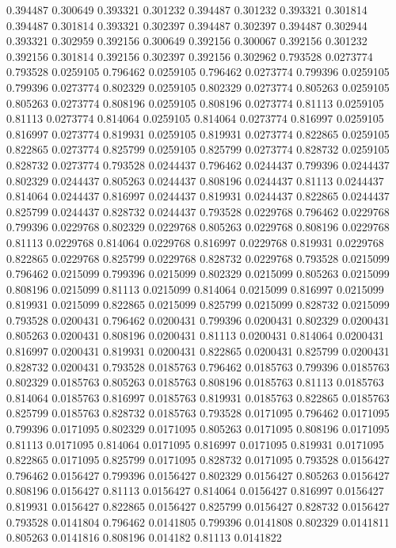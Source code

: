 0.394487 0.300649
0.393321 0.301232
0.394487 0.301232
0.393321 0.301814
0.394487 0.301814
0.393321 0.302397
0.394487 0.302397
0.394487 0.302944
0.393321 0.302959
0.392156 0.300649
0.392156 0.300067
0.392156 0.301232
0.392156 0.301814
0.392156 0.302397
0.392156 0.302962
0.793528 0.0273774
0.793528 0.0259105
0.796462 0.0259105
0.796462 0.0273774
0.799396 0.0259105
0.799396 0.0273774
0.802329 0.0259105
0.802329 0.0273774
0.805263 0.0259105
0.805263 0.0273774
0.808196 0.0259105
0.808196 0.0273774
0.81113 0.0259105
0.81113 0.0273774
0.814064 0.0259105
0.814064 0.0273774
0.816997 0.0259105
0.816997 0.0273774
0.819931 0.0259105
0.819931 0.0273774
0.822865 0.0259105
0.822865 0.0273774
0.825799 0.0259105
0.825799 0.0273774
0.828732 0.0259105
0.828732 0.0273774
0.793528 0.0244437
0.796462 0.0244437
0.799396 0.0244437
0.802329 0.0244437
0.805263 0.0244437
0.808196 0.0244437
0.81113 0.0244437
0.814064 0.0244437
0.816997 0.0244437
0.819931 0.0244437
0.822865 0.0244437
0.825799 0.0244437
0.828732 0.0244437
0.793528 0.0229768
0.796462 0.0229768
0.799396 0.0229768
0.802329 0.0229768
0.805263 0.0229768
0.808196 0.0229768
0.81113 0.0229768
0.814064 0.0229768
0.816997 0.0229768
0.819931 0.0229768
0.822865 0.0229768
0.825799 0.0229768
0.828732 0.0229768
0.793528 0.0215099
0.796462 0.0215099
0.799396 0.0215099
0.802329 0.0215099
0.805263 0.0215099
0.808196 0.0215099
0.81113 0.0215099
0.814064 0.0215099
0.816997 0.0215099
0.819931 0.0215099
0.822865 0.0215099
0.825799 0.0215099
0.828732 0.0215099
0.793528 0.0200431
0.796462 0.0200431
0.799396 0.0200431
0.802329 0.0200431
0.805263 0.0200431
0.808196 0.0200431
0.81113 0.0200431
0.814064 0.0200431
0.816997 0.0200431
0.819931 0.0200431
0.822865 0.0200431
0.825799 0.0200431
0.828732 0.0200431
0.793528 0.0185763
0.796462 0.0185763
0.799396 0.0185763
0.802329 0.0185763
0.805263 0.0185763
0.808196 0.0185763
0.81113 0.0185763
0.814064 0.0185763
0.816997 0.0185763
0.819931 0.0185763
0.822865 0.0185763
0.825799 0.0185763
0.828732 0.0185763
0.793528 0.0171095
0.796462 0.0171095
0.799396 0.0171095
0.802329 0.0171095
0.805263 0.0171095
0.808196 0.0171095
0.81113 0.0171095
0.814064 0.0171095
0.816997 0.0171095
0.819931 0.0171095
0.822865 0.0171095
0.825799 0.0171095
0.828732 0.0171095
0.793528 0.0156427
0.796462 0.0156427
0.799396 0.0156427
0.802329 0.0156427
0.805263 0.0156427
0.808196 0.0156427
0.81113 0.0156427
0.814064 0.0156427
0.816997 0.0156427
0.819931 0.0156427
0.822865 0.0156427
0.825799 0.0156427
0.828732 0.0156427
0.793528 0.0141804
0.796462 0.0141805
0.799396 0.0141808
0.802329 0.0141811
0.805263 0.0141816
0.808196 0.014182
0.81113 0.0141822
